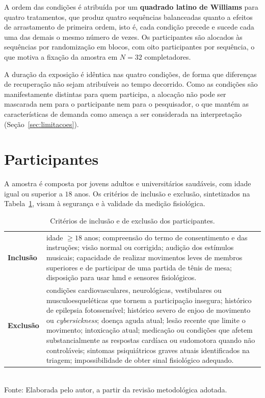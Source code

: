 A ordem das condições é atribuída por um \textbf{quadrado latino de Williams} para quatro tratamentos, que produz quatro sequências balanceadas quanto a efeitos de arrastamento de primeira ordem, isto é, cada condição precede e sucede cada uma das demais o mesmo número de vezes. Os participantes são alocados às sequências por randomização em blocos, com oito participantes por sequência, o que motiva a fixação da amostra em $N = 32$ completadores.

A duração da exposição é idêntica nas quatro condições, de forma que diferenças de recuperação não sejam atribuíveis ao tempo decorrido. Como as condições são manifestamente distintas para quem participa, a alocação não pode ser mascarada nem para o participante nem para o pesquisador, o que mantém as características de demanda como ameaça a ser considerada na interpretação (Seção~\ref{sec:limitacoes}).

\section{Participantes}\label{sec:participantes}

A amostra é composta por jovens adultos e universitários saudáveis, com idade igual ou superior a $18$ anos. Os critérios de inclusão e exclusão, sintetizados na Tabela~\ref{tab:criterios}, visam à segurança e à validade da medição fisiológica.

\begin{table}[H]
    \centering
    \caption{Critérios de inclusão e de exclusão dos participantes.}
    \label{tab:criterios}
    \small
    \begin{tabularx}{\textwidth}{p{3.2cm}X}
        \toprule
        \textbf{Inclusão} & idade $\geq 18$ anos; compreensão do termo de consentimento e das instruções; visão normal ou corrigida; audição dos estímulos musicais; capacidade de realizar movimentos leves de membros superiores e de participar de uma partida de tênis de mesa; disposição para usar \gls{hmd} e sensores fisiológicos. \\
        \addlinespace
        \textbf{Exclusão} & condições cardiovasculares, neurológicas, vestibulares ou musculoesqueléticas que tornem a participação insegura; histórico de epilepsia fotossensível; histórico severo de enjoo de movimento ou \textit{cybersickness}; doença aguda atual; lesão recente que limite o movimento; intoxicação atual; medicação ou condições que afetem substancialmente as respostas cardíaca ou sudomotora quando não controláveis; sintomas psiquiátricos graves atuais identificados na triagem; impossibilidade de obter sinal fisiológico adequado. \\
        \bottomrule
    \end{tabularx}\\[2pt]
    {\footnotesize Fonte: Elaborada pelo autor, a partir da revisão metodológica adotada.}
\end{table}

